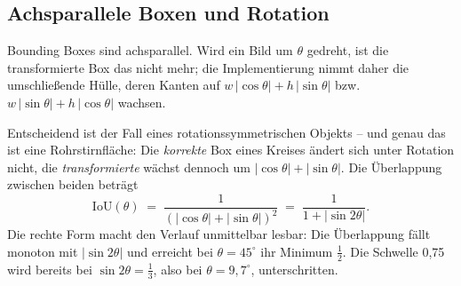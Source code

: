 \subsection{Achsparallele Boxen und Rotation}
\label{sec:boxrotation}

Bounding Boxes sind achsparallel. Wird ein Bild um $\theta$ gedreht, ist die
transformierte Box das nicht mehr; die Implementierung nimmt daher die
umschließende Hülle, deren Kanten auf $w\,|\cos\theta| + h\,|\sin\theta|$
bzw.\ $w\,|\sin\theta| + h\,|\cos\theta|$ wachsen.

Entscheidend ist der Fall eines rotationssymmetrischen Objekts -- und genau das
ist eine Rohrstirnfläche: Die \emph{korrekte} Box eines Kreises ändert sich unter
Rotation nicht, die \emph{transformierte} wächst dennoch um
$|\cos\theta| + |\sin\theta|$. Die Überlappung zwischen beiden beträgt
\begin{equation}
\mathrm{IoU}(\theta) \;=\; \frac{1}{(|\cos\theta| + |\sin\theta|)^2}
\;=\; \frac{1}{1 + |\sin 2\theta|}.
\label{eq:ioutheta}
\end{equation}
Die rechte Form macht den Verlauf unmittelbar lesbar: Die Überlappung fällt
monoton mit $|\sin 2\theta|$ und erreicht bei $\theta = 45^\circ$ ihr Minimum
$\tfrac12$. Die Schwelle 0,75 wird bereits bei $\sin 2\theta = \tfrac13$, also
bei $\theta = 9{,}7^\circ$, unterschritten.

